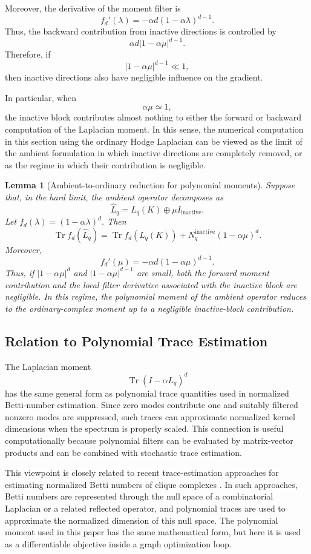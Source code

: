 \documentclass[pdflatex,sn-mathphys-ay]{sn-jnl}%
\theoremstyle{thmstyleone}%
\theoremstyle{thmstyletwo}%
\newtheorem{lemma}[theorem]{Lemma}
\theoremstyle{thmstylethree}%
\begin{document}
Moreover, the derivative of the moment filter is
\[
f_d'(\lambda)
=
-\alpha d(1-\alpha\lambda)^{d-1}.
\]
Thus, the backward contribution from inactive directions is controlled by
\[
\alpha d |1-\alpha\mu|^{d-1}.
\]
Therefore, if
\[
|1-\alpha\mu|^{d-1}\ll 1,
\]
then inactive directions also have negligible influence on the gradient.

In particular, when
\[
\alpha\mu\simeq 1,
\]
the inactive block contributes almost nothing to either the forward or backward computation of the Laplacian moment. In this sense, the numerical computation in this section using the ordinary Hodge Laplacian can be viewed as the limit of the ambient formulation in which inactive directions are completely removed, or as the regime in which their contribution is negligible.


\begin{lemma}[Ambient-to-ordinary reduction for polynomial moments]
Suppose that, in the hard limit, the ambient operator decomposes as
\[
\widehat{L}_q
=
L_q(K)\oplus \mu I_{\mathrm{inactive}}.
\]
Let \(f_d(\lambda)=(1-\alpha\lambda)^d\). Then
\[
\operatorname{Tr}f_d(\widehat{L}_q)
=
\operatorname{Tr}f_d(L_q(K))
+
N_q^{\mathrm{inactive}}(1-\alpha\mu)^d.
\]
Moreover,
\[
f_d'(\mu)
=
-\alpha d(1-\alpha\mu)^{d-1}.
\]
Thus, if \(|1-\alpha\mu|^d\) and \(|1-\alpha\mu|^{d-1}\) are small, both the forward moment contribution and the local filter derivative associated with the inactive block are negligible. In this regime, the polynomial moment of the ambient operator reduces to the ordinary-complex moment up to a negligible inactive-block contribution.
\end{lemma}



\subsection{Relation to Polynomial Trace Estimation}

The Laplacian moment
\[
\operatorname{Tr}(I-\alpha L_q)^d
\]
has the same general form as polynomial trace quantities used in normalized Betti-number estimation. Since zero modes contribute one and suitably filtered nonzero modes are suppressed, such traces can approximate normalized kernel dimensions when the spectrum is properly scaled. This connection is useful computationally because polynomial filters can be evaluated by matrix-vector products and can be combined with stochastic trace estimation.

This viewpoint is closely related to recent trace-estimation approaches for estimating normalized Betti numbers of clique complexes \cite{lloyd2016quantum,akhalwaya2024comparing,gyurik2022towards}. In such approaches, Betti numbers are represented through the null space of a combinatorial Laplacian or a related reflected operator, and polynomial traces are used to approximate the normalized dimension of this null space. The polynomial moment used in this paper has the same mathematical form, but here it is used as a differentiable objective inside a graph optimization loop.
\end{document}
